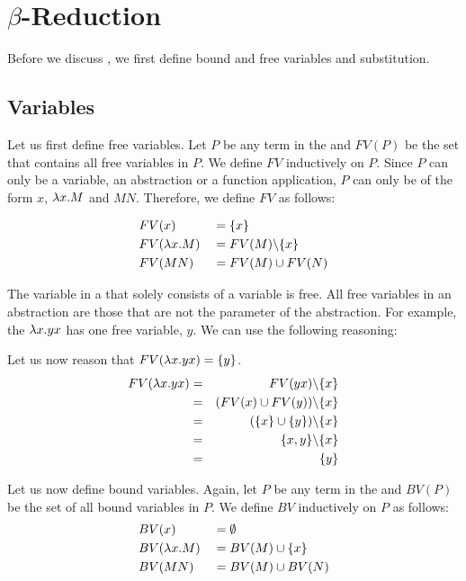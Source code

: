 \section{\texorpdfstring{\boldmath${\beta}$-Reduction}{Beta Reduction}}
Before we discuss \br, we first define bound and free variables and substitution.

\subsection{Variables}

\begin{definition}
	\label{def:free-variable}
	Let us first define free variables. 
	Let $P$ be any term in the \lc and $FV(P)$ be the set that contains all free variables in $P$. We define $FV$ inductively on $P$.
	Since $P$ can only be a variable, an abstraction or a function application, $P$ can only be of the form $x$, $\lambda {x}.{M}$ and $M N$.
	Therefore, we define $FV$ as follows:
	
	\[
	\begin{aligned}
		& FV(x)           & &= \{x\} \\
		& FV(\lambda {x}.{M}) & &= FV(M) \backslash \{x\} \\
		& FV(M N)         & &= FV(M) \cup FV(N)
	\end{aligned}
	\]
\end{definition}

The variable in a \lterm that solely consists of a variable is free. All free variables in an abstraction are those that are not the parameter of the abstraction.
For example, the \lterm $\lambda {x}.{yx}$ has one free variable, $y$. We can use the following reasoning:

\begin{example}
	\label{ex:free-variable}
	Let us now reason that $FV(\lambda {x}.{yx}) = \{y\}$.
	\begin{eqnarray*}
		FV(\lambda {x}.{yx}) &=& FV(y x) \backslash \{x\} \\
		&=& (FV(x) \cup FV(y)) \backslash \{x\} \\
		&=& (\{x\} \cup \{y\}) \backslash \{x\} \\
		&=& \{x, y\} \backslash \{x\} \\
		&=& \{y\}
	\end{eqnarray*}
\end{example}


\begin{definition}
	\label{def:bound-variable}
	Let us now define bound variables. Again, let $P$ be any term in the \lc and $BV(P)$ be the set of all bound variables in $P$. 
	We define $BV$ inductively on $P$ as follows:
	\[
	\begin{aligned}
		& BV(x)           & &= \emptyset \\
		& BV(\lambda {x}.{M}) & &= BV(M) \cup \{x\} \\
		& BV(M N)         & &= BV(M) \cup BV(N)
	\end{aligned}
	\]
\end{definition}


